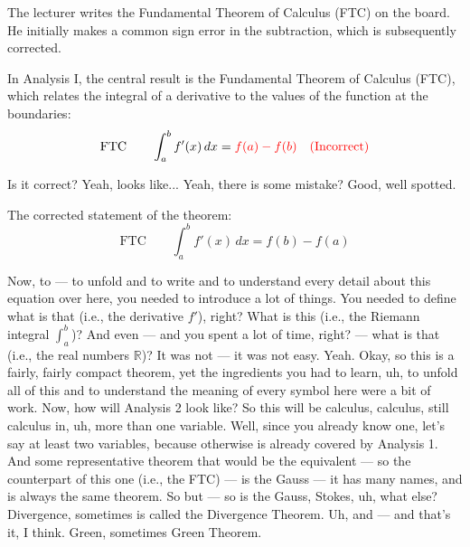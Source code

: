 \begin{nice-box}
The lecturer writes the Fundamental Theorem of Calculus (FTC) on the board. He initially makes a common sign error in the subtraction, which is subsequently corrected.
\end{nice-box}

\begin{math-stroke}
\begin{ai-type-check-invisible-content}
\end{ai-type-check-invisible-content}
In Analysis I, the central result is the Fundamental Theorem of Calculus (FTC), which relates the integral of a derivative to the values of the function at the boundaries:
\[ \text{FTC} \qquad \int_{a}^{b} f'(x) \, dx = \textcolor{red}{f(a) - f(b)} \quad \text{\textcolor{red}{(Incorrect)}} \]
\end{math-stroke}

\begin{spoken-clean}[00:08:35 - 00:08:50]
Is it correct? Yeah, looks like...  Yeah, there is some mistake?  Good, well spotted.
\end{spoken-clean}

\begin{math-stroke}
The corrected statement of the theorem:
\[ \text{FTC} \qquad \int_{a}^{b} f'(x) \, dx = f(b) - f(a) \]
\end{math-stroke}

\begin{spoken-clean}[00:08:50 - 00:10:32]
Now, to — to unfold and to write and to understand every detail about this equation over here, you needed to introduce a lot of things. You needed to define what is that (i.e., the derivative $f'$), right? What is this (i.e., the Riemann integral $\int_{a}^{b}$)? And even — and you spent a lot of time, right? — what is that (i.e., the real numbers $\mathbb{R}$)? It was not — it was not easy. Yeah. Okay, so this is a fairly, fairly compact theorem, yet the ingredients you had to learn, uh, to unfold all of this and to understand the meaning of every symbol here were a bit of work. Now, how will Analysis 2 look like?  So this will be calculus, calculus, still calculus in, uh, more than one variable. Well, since you already know one, let's say at least two variables, because otherwise is already covered by Analysis 1. And some representative theorem that would be the equivalent — so the counterpart of this one (i.e., the FTC) — is the Gauss — it has many names, and is always the same theorem. So but — so is the Gauss, Stokes, uh, what else? Divergence, sometimes is called the Divergence Theorem. Uh, and — and that's it, I think. Green, sometimes Green Theorem.
\end{spoken-clean}

